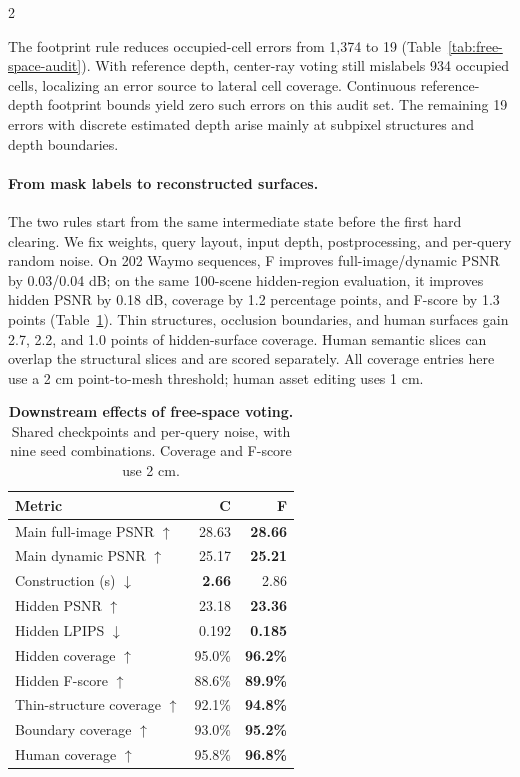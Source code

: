 \begin{multicols}{2}

The footprint rule reduces occupied-cell errors from 1,374 to 19 (Table~\ref{tab:free-space-audit}). With reference depth, center-ray voting still mislabels 934 occupied cells, localizing an error source to lateral cell coverage. Continuous reference-depth footprint bounds yield zero such errors on this audit set. The remaining 19 errors with discrete estimated depth arise mainly at subpixel structures and depth boundaries.

\paragraph{From mask labels to reconstructed surfaces.}
The two rules start from the same intermediate state before the first hard clearing. We fix weights, query layout, input depth, postprocessing, and per-query random noise. On 202 Waymo sequences, F improves full-image/dynamic PSNR by 0.03/0.04 dB; on the same 100-scene hidden-region evaluation, it improves hidden PSNR by 0.18 dB, coverage by 1.2 percentage points, and F-score by 1.3 points (Table~\ref{tab:free-space-downstream}). Thin structures, occlusion boundaries, and human surfaces gain 2.7, 2.2, and 1.0 points of hidden-surface coverage. Human semantic slices can overlap the structural slices and are scored separately. All coverage entries here use a 2 cm point-to-mesh threshold; human asset editing uses 1 cm.

\begin{table}[H]
\centering\small
\caption{\textbf{Downstream effects of free-space voting.} Shared checkpoints and per-query noise, with nine seed combinations. Coverage and F-score use 2 cm.}
\label{tab:free-space-downstream}
\begin{tabular*}{\linewidth}{@{\extracolsep{\fill}}lrr@{}}
\toprule
Metric & C & F\\
\midrule
Main full-image PSNR $\uparrow$ & 28.63 & \textbf{28.66} \\
Main dynamic PSNR $\uparrow$ & 25.17 & \textbf{25.21} \\
Construction (s) $\downarrow$ & \textbf{2.66} & 2.86 \\
Hidden PSNR $\uparrow$ & 23.18 & \textbf{23.36}\\
Hidden LPIPS $\downarrow$ & 0.192 & \textbf{0.185}\\
Hidden coverage $\uparrow$ & 95.0\% & \textbf{96.2\%}\\
Hidden F-score $\uparrow$ & 88.6\% & \textbf{89.9\%}\\
Thin-structure coverage $\uparrow$ & 92.1\% & \textbf{94.8\%}\\
Boundary coverage $\uparrow$ & 93.0\% & \textbf{95.2\%}\\
Human coverage $\uparrow$ & 95.8\% & \textbf{96.8\%}\\
\bottomrule
\end{tabular*}
\end{table}


\end{multicols}
